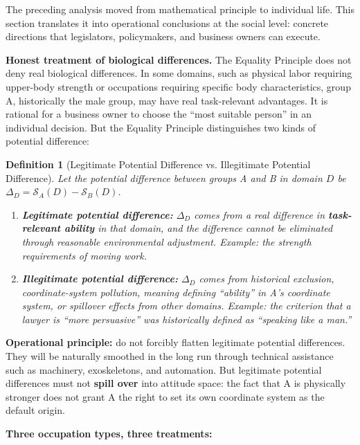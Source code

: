 \documentclass[12pt,a4paper]{article}
\newtheorem{definition}[theorem]{Definition}
\theoremstyle{remark}
\begin{document}
The preceding analysis moved from mathematical principle to individual life. This section translates it into operational conclusions at the social level: concrete directions that legislators, policymakers, and business owners can execute.

\textbf{Honest treatment of biological differences.} The Equality Principle does not deny real biological differences. In some domains, such as physical labor requiring upper-body strength or occupations requiring specific body characteristics, group A, historically the male group, may have real task-relevant advantages. It is rational for a business owner to choose the ``most suitable person'' in an individual decision. But the Equality Principle distinguishes two kinds of potential difference:

\begin{definition}[Legitimate Potential Difference vs. Illegitimate Potential Difference]\label{def:legitimate_delta}
Let the potential difference between groups A and B in domain $D$ be $\Delta_D = \mathcal{S}_A(D) - \mathcal{S}_B(D)$.
\begin{enumerate}[label=(\roman*)]
    \item \textbf{Legitimate potential difference:} $\Delta_D$ comes from a real difference in \textbf{task-relevant ability} in that domain, and the difference cannot be eliminated through reasonable environmental adjustment. Example: the strength requirements of moving work.
    \item \textbf{Illegitimate potential difference:} $\Delta_D$ comes from historical exclusion, coordinate-system pollution, meaning defining ``ability'' in A's coordinate system, or spillover effects from other domains. Example: the criterion that a lawyer is ``more persuasive'' was historically defined as ``speaking like a man.''
\end{enumerate}
\end{definition}

\textbf{Operational principle:} do not forcibly flatten legitimate potential differences. They will be naturally smoothed in the long run through technical assistance such as machinery, exoskeletons, and automation. But legitimate potential differences must not \textbf{spill over} into attitude space: the fact that A is physically stronger does not grant A the right to set its own coordinate system as the default origin.

\textbf{Three occupation types, three treatments:}
\end{document}
